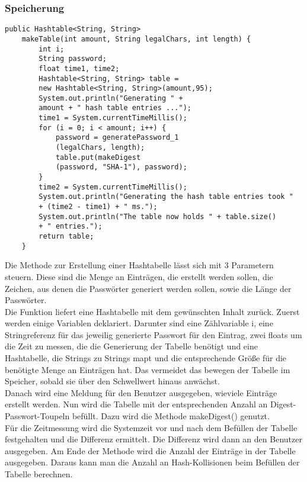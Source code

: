 \documentclass[11pt]{article}
\begin{document}
\subsubsection{Speicherung}
\begin{lstlisting}[caption=Algorithmus zur Füllung der Hashtabelle, label=lst:makeTable, basicstyle=\tiny]
    public Hashtable<String, String> 
    makeTable(int amount, String legalChars, int length) {
        int i;
        String password;
        float time1, time2;
        Hashtable<String, String> table = 
        new Hashtable<String, String>(amount,95);
        System.out.println("Generating " + 
        amount + " hash table entries ...");
        time1 = System.currentTimeMillis();
        for (i = 0; i < amount; i++) {
            password = generatePassword_1
            (legalChars, length);
            table.put(makeDigest
            (password, "SHA-1"), password);
        }
        time2 = System.currentTimeMillis();
        System.out.println("Generating the hash table entries took " 
        + (time2 - time1) + " ms.");
        System.out.println("The table now holds " + table.size() 
        + " entries.");
        return table;
    }
\end{lstlisting}
Die Methode zur Erstellung einer Hashtabelle lässt sich mit 3 Parametern steuern. Diese sind die Menge an Einträgen, die erstellt werden sollen, die Zeichen, aus denen die Passwörter generiert werden sollen, sowie die Länge der Passwörter.\\
Die Funktion liefert eine Hashtabelle mit dem gewünschten Inhalt zurück.
Zuerst werden einige Variablen deklariert. Darunter sind eine Zählvariable i, eine Stringreferenz für das jeweilig generierte Passwort für den Eintrag, zwei floats um die Zeit zu messen, die die Generierung der Tabelle benötigt und eine Hashtabelle, die Strings zu Strings mapt und die entsprechende Größe für die benötigte Menge an Einträgen hat. Das vermeidet das bewegen der Tabelle im Speicher, sobald sie über den Schwellwert hinaus anwächst.\\
Danach wird eine Meldung für den Benutzer ausgegeben, wieviele Einträge erstellt werden.
Nun wird die Tabelle mit der entsprechenden Anzahl an Digest-Passwort-Toupeln befüllt. Dazu wird die Methode makeDigest() genutzt.\\
Für die Zeitmessung wird die Systemzeit vor und nach dem Befüllen der Tabelle festgehalten und die Differenz ermittelt. Die Differenz wird dann an den Benutzer ausgegeben. Am Ende der Methode wird die Anzahl der Einträge in der Tabelle ausgegeben. Daraus kann man die Anzahl an Hash-Kollisionen beim Befüllen der Tabelle berechnen.
\end{document}
